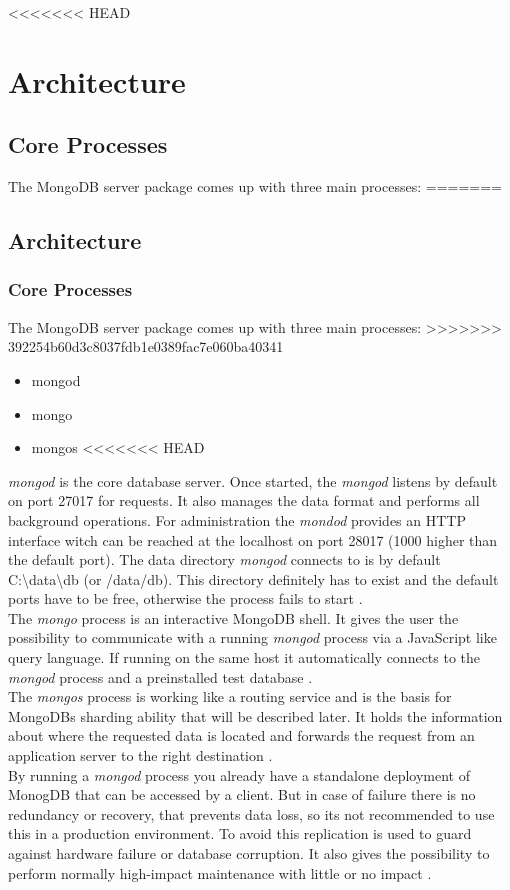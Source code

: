 <<<<<<< HEAD
\newcommand{\anfu}[1]{\glqq #1\grqq}
\newcommand{\anfuc}[2]{\anfu{#1}\cite{#2}}

\chapter{Architecture}
\section{Core Processes}
The MongoDB server package comes up with three main processes:
=======
\newcommand{\anfu}[1]{\glqq #1\grqq}
\newcommand{\anfuc}[2]{\anfu{#1}\cite{#2}}

\section{Architecture}
\subsection{Core Processes}
The MongoDB server package comes up with three main processes:
>>>>>>> 392254b60d3c8037fdb1e0389fac7e060ba40341
\begin{itemize}
  \item mongod
  \item mongo
  \item mongos
<<<<<<< HEAD
\end{itemize}
\textit{mongod} is the core database server. Once started, the \textit{mongod} listens by default on port 27017 for requests. It also manages the data format and performs all background operations. For administration the \textit{mondod} provides an HTTP interface witch can be reached at the localhost on port 28017 (1000 higher than the default port). The data directory \textit{mongod} connects to is by default C:\textbackslash data\textbackslash db (or /data/db). This directory definitely has to exist and the default ports have to be free, otherwise the process fails to start \cite{pracmong}.\\
The \textit{mongo} process is an interactive MongoDB shell. It gives the user the possibility to communicate with a running \textit{mongod} process via a JavaScript like query language. If running on the same host it automatically connects to the \textit{mongod} process and a preinstalled test database \cite{pracmong}.\\
The \textit{mongos} process is working like a routing service and is the basis for MongoDBs sharding ability that will be described later. It holds the information about where the requested data is located and forwards the request from an application server to the right destination \cite{pracmong}. \\
By running a \textit{mongod} process you already have a standalone deployment of MonogDB that can be accessed by a client. But in case of failure there is no redundancy or recovery, that prevents data loss, so its not recommended to use this in a production environment. To avoid this replication is used to guard against hardware failure or database corruption. It also gives the possibility to perform normally high-impact maintenance with little or no impact \cite{theguide}.

